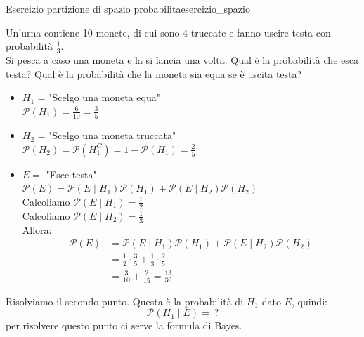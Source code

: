 \documentclass[12pt]{report}
\newcounter{exercise}
\newcommand{\nmu}{}
\begin{document}
	\begin{exercise}{\nmu Esercizio partizione di spazio probabilita}{esercizio_spazio}
		\begin{assignment}{}{}
			Un'urna contiene 10 monete, di cui sono 4 truccate e fanno uscire testa con probabilità $\frac{1}{3}$. \\
			Si pesca a caso una moneta e la si lancia una volta. Qual è la probabilità che esca testa? Qual è la probabilità che la moneta sia equa se è uscita testa?
		\end{assignment}
		\begin{itemize}
			\item $H_1$ = "Scelgo una moneta equa" \\
				$\mathcal{P}(H_1) = \frac{6}{10} = \frac{3}{5}$
			\item $H_2$ = "Scelgo una moneta truccata" \\
			$\mathcal{P}(H_2) = \mathcal{P}(H_1^C) = 1 - \mathcal{P}(H_1) = \frac{2}{5}$
			\item $E = $ "Esce testa" \\
			$\mathcal{P}(E) = \mathcal{P}(E \mid H_1)\mathcal{P}(H_1) + \mathcal{P}(E \mid H_2)\mathcal{P}(H_2)$ \\
			Calcoliamo $\mathcal{P}(E \mid H_1) = \frac{1}{2}$ \\
			Calcoliamo $\mathcal{P}(E \mid H_2) = \frac{1}{3}$ \\
			Allora:
			\begin{align*}
				\mathcal{P}(E) &= \mathcal{P}(E \mid H_1)\mathcal{P}(H_1) + \mathcal{P}(E \mid H_2)\mathcal{P}(H_2) \\
				&= \frac{1}{2} \cdot \frac{3}{5} + \frac{1}{3} \cdot \frac{2}{5} \\
				&= \frac{3}{10} + \frac{2}{15} = \frac{13}{30}
			\end{align*}
		\end{itemize}

		Risolviamo il secondo punto. Questa è la probabilità di $H_1$ dato $E$, quindi:
		\[
		\mathcal{P}(H_1 \mid E) =\ ?
		\]
		per risolvere questo punto ci serve la formula di Bayes.
	\end{exercise}
\end{document}

